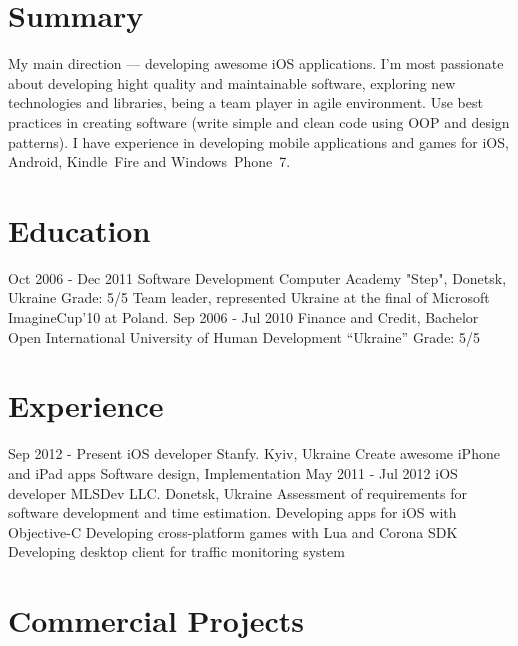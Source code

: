\documentclass[11pt,a4paper]{moderncv}
\begin{document}
\makecvtitle

\section{Summary}
\cvitem
  {}
  {My main direction --- developing awesome iOS applications.\newline{}
  I'm most passionate about developing hight quality and maintainable software, exploring new technologies and libraries, being a team player in agile environment. Use best practices in creating software (write simple and clean code using OOP and design patterns). I have experience in developing mobile applications and games for iOS, Android, Kindle~Fire and Windows~Phone~7.{}}

\section{Education}
  \cventry
    {Oct 2006 - Dec 2011}
    {Software Development}
    {Computer Academy "Step", Donetsk, Ukraine}
    {Grade: 5/5}{}
    {Team leader, represented Ukraine at the final of Microsoft ImagineCup'10 at Poland.}
  \cventry
    {Sep 2006 - Jul 2010}
    {Finance and Credit, Bachelor}
    {\newline Open International University of Human Development “Ukraine”}
    {Grade: 5/5}{}{}

\section{Experience}
\cventry
  {Sep 2012 - Present}
  {iOS developer}
  {Stanfy. Kyiv, Ukraine}
  {}{}
  {Create awesome iPhone and iPad apps
  \newline Software design, Implementation}
\cventry
  {May 2011 - Jul 2012}
  {iOS developer}
  {MLSDev LLC. Donetsk, Ukraine}
  {}{}
  {Assessment of requirements for software development and time estimation. 
  \newline Developing apps for iOS with Objective-C
  \newline Developing cross-platform games with Lua and Corona SDK
  \newline Developing desktop client for traffic monitoring system}

\section{Commercial Projects}
\end{document}
